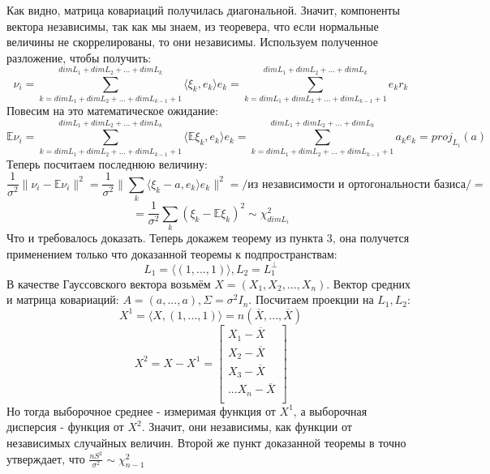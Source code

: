 \documentclass[a4paper,12pt]{article}
\newcommand{\expec}{\mathbb{E}}
\newcommand{\sample}{X_1, X_2, ..., X_n}
\theoremstyle{named}
\begin{document}
Как видно, матрица ковариаций получилась диагональной. Значит, компоненты вектора независимы, так как мы знаем, из теоревера, что если нормальные величины не 
скоррелированы, то они независимы. Используем полученное разложение, чтобы получить:
$$
    \nu_i = \sum_{k = dim L_1 + dim L_2 + ... + dim L_{k-1} + 1}^{dim L_1 + dim L_2 + ... + dim L_{k}} \langle \xi_k, e_k \rangle e_k = 
    \sum_{k = dim L_1 + dim L_2 + ... + dim L_{k-1} + 1}^{dim L_1 + dim L_2 + ... + dim L_{k}}  e_kr_k
$$
Повесим на это математическое ожидание:
$$
    \expec \nu_i = \sum_{k = dim L_1 + dim L_2 + ... + dim L_{k-1} + 1}^{dim L_1 + dim L_2 + ... + dim L_{k}} \langle \expec\xi_k, e_k \rangle e_k
    = \sum_{k = dim L_1 + dim L_2 + ... + dim L_{k-1} + 1}^{dim L_1 + dim L_2 + ... + dim L_{k}} a_k e_k = proj_{L_i} (a)
$$
Теперь посчитаем последнюю величину:
$$
    \frac{1}{\sigma^2}\| \nu_i - \expec \nu_i \|^2 = \frac{1}{\sigma^2} \| \sum_k \langle \xi_k - a, e_k \rangle e_k \|^2 = /\text{из независимости и ортогональности базиса}/ =
$$
$$
    = \frac{1}{\sigma^2} \sum_k (\xi_k - \expec \xi_k)^2 \sim \chi^2_{dim L_i}
$$
Что и требовалось доказать. Теперь докажем теорему из пункта 3, она получется применением только что доказанной теоремы к подпространствам: 
$$
    L_1 = \langle (1, ..., 1) \rangle, L_2 = L_1^{\perp}
$$
В качестве Гауссовского вектора возьмём $X = (\sample)$. Вектор средних и матрица ковариаций: $A = (a, ..., a), \Sigma = \sigma^2 I_n$. 
Посчитаем проекции на $L_1, L_2$:
$$
    X^1 = \langle X, (1, ..., 1)\rangle = n(\overline{X}, ..., \overline{X})
$$
$$
    X^2 = X - X^1 = \begin{bmatrix}
        X_1 - \overline{X} \\
        X_2 - \overline{X} \\ 
        X_3 - \overline{X} \\
        ...
        X_n - \overline{X} \\
    \end{bmatrix}
$$
Но тогда выборочное среднее - измеримая функция от $X^1$, а выборочная дисперсия - функция от $X^2$. Значит, они независимы, как функции от независимых 
случайных величин. Второй же пункт доказанной теоремы в точно утверждает, что $\frac{nS^2}{\sigma^2} \sim \chi^2_{n-1}$
\end{document}
